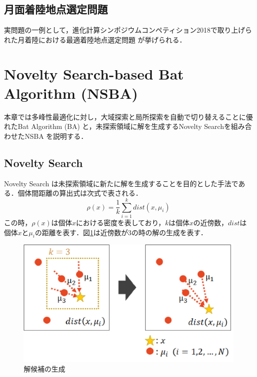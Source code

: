 \documentclass[a4j,11pt]{jarticle}
\def\proposed{DNRBA}
\begin{document}
\subsection{月面着陸地点選定問題}
\label{ss:LSM}
実問題の一例として，進化計算シンポジウムコンペティション2018で取り上げられた月着陸における最適着陸地点選定問題 \cite{ECCompetition} が挙げられる．

\clearpage
\newpage
\section{Novelty Search-based Bat Algorithm (NSBA)}
\label{sec:NSBA}
本章では多峰性最適化に対し，大域探索と局所探索を自動で切り替えることに優れたBat Algorithm (BA) と，未探索領域に解を生成するNovelty Searchを組み合わせたNSBA \cite{NSBA} を説明する．

\subsection{Novelty Search}
\label{ss:NS}
Novelty Search \cite{NS} は未探索領域に新たに解を生成することを目的とした手法である．個体間距離の算出式は次式で表される．
\begin{equation}
\label{eq:ns}
\rho(x)=\frac{1}{k}\sum_{i=1}^k dist(x,\mu_i)
\end{equation}
この時，$\rho(x)$は個体$x$における密度を表しており，$kは$個体$x$の近傍数，$dist$は個体$x$と$\mu_i$の距離を表す．図\ref{fig:ns}は近傍数が3の時の解の生成を表す．
\begin{figure}[h]
  \centering
  \includegraphics[width=0.8\linewidth]{eps/IES2018/ns.eps}
  \caption{解候補の生成}
  \label{fig:ns}
\end{figure}
\end{document}
